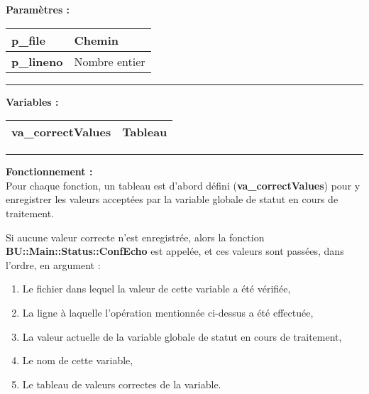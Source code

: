 \documentclass[a4paper,10pt]{article}
\begin{document}
\begin{justify}
    \textbf{Paramètres :}

    \begin{tabular}{|l|l|}
        \hline
        \textbf{\color{orange}p\_file} & Chemin\\
        \hline
        \textbf{\color{orange}p\_lineno} & Nombre entier\\
        \hline
    \end{tabular}
\end{justify}

\setlength{\parskip}{2em}

\par\noindent\rule{\textwidth}{0.4pt}\setlength{\parskip}{1em}

\begin{justify}
    \textbf{Variables :}

    \begin{tabular}{|l|l|}
        \hline
        \textbf{\color{orange}va\_correctValues} & Tableau\\
        \hline
    \end{tabular}
\end{justify}\setlength{\parskip}{1em}


\par\noindent\rule{\textwidth}{0.4pt}

\begin{justify}
    \textbf{Fonctionnement :}\\[1\baselineskip]
    Pour chaque fonction, un tableau est d'abord défini (\textbf{\color{orange}va\_correctValues}) pour y enregistrer les valeurs acceptées par la variable globale de statut en cours de traitement.
\end{justify}

\begin{justify}
    Si aucune valeur correcte n'est enregistrée, alors la fonction \textbf{\color{mauve}BU::Main::Status::ConfEcho} est appelée, et ces valeurs sont passées, dans l'ordre, en argument :
    
    \begin{enumerate}
        \item Le fichier dans lequel la valeur de cette variable a été vérifiée,
        \item La ligne à laquelle l'opération mentionnée ci-dessus a été effectuée,
        \item La valeur actuelle de la variable globale de statut en cours de traitement,
        \item Le nom de cette variable,
        \item Le tableau de valeurs correctes de la variable.
    \end{enumerate}
\end{justify}
\end{document}

